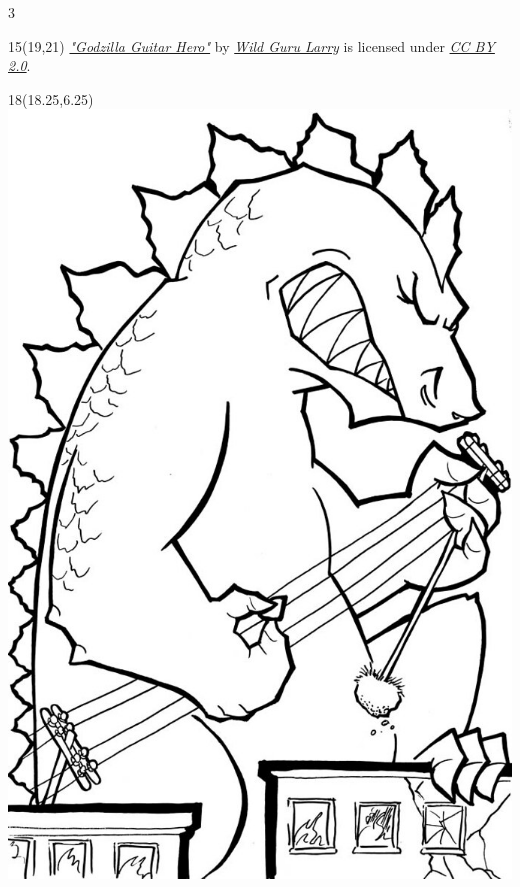 \documentclass[10pt,oneside,letterpaper,landscape]{memoir}
\newlength{\currentparskip}
\newenvironment{mpage}[1]{%
        \setlength{\currentparskip}{\parskip}%
             \begin{minipage}{#1}%
         \setlength{\parskip}{\currentparskip}%
    }
{\end{minipage}}
\begin{document}
\begin{multicols}{3}

  \begin{textblock}{15}(19,21)
      \footnotesize
      	\textit{\href{https://www.flickr.com/photos/79023099@N00/5506704850}{"Godzilla Guitar Hero"}} by \textit{\href{https://www.flickr.com/photos/79023099@N00}{Wild Guru Larry}} is licensed under \textit{\href{https://creativecommons.org/licenses/by/2.0/?ref=ccsearch&atype=rich}{CC BY 2.0}}.
  \end{textblock}

\begin{textblock}{18}(18.25,6.25)
    \includegraphics[width=.5\textwidth]{images/5506704850_a8cce4bb2c_b.jpg}
\end{textblock}




\begin{mpage}{2.13\columnwidth}


\end{mpage}
\end{multicols}
\end{document}
